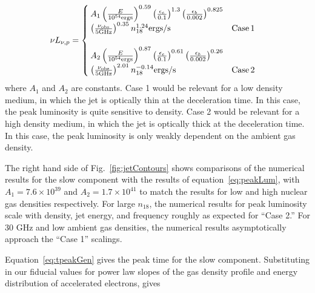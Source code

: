 \documentclass[usenatbib,fleqn]{mnras}
\begin{document}
\begin{align}
\nu L_{\nu, p}&=
\begin{cases}
  A_1 \left(\frac{E}{10^{54} {\rm ergs}}\right)^{0.59}
  \left(\frac{\epsilon_e}{0.1}\right)^{1.3}
  \left(\frac{\epsilon_b}{0.002}\right)^{0.825}\\
  \left(\frac{\nu_{\rm obs}}{5 {\rm GHz}}\right)^{0.35} n_{18}^{1.24} {\rm ergs/s} & {\rm Case \,1}\\\\
  A_2 \left(\frac{E}{10^{54} {\rm ergs}}\right)^{0.87}
  \left(\frac{\epsilon_e}{0.1}\right)^{0.61}
  \left(\frac{\epsilon_b}{0.002}\right)^{0.26}\\
  \left(\frac{\nu_{\rm obs}}{5 {\rm GHz}}\right)^{2.01} n_{18}^{-0.14}
  {\rm ergs/s} & {\rm Case \,2}
\end{cases}
\label{eq:peakLum}
\end{align}
%
where $A_1$ and $A_2$ are constants.  Case 1 would be relevant for a
low density medium, in which the jet is optically thin at the
deceleration time. In this case, the peak luminosity is quite
sensitive to density. Case 2 would be relevant for a high density
medium, in which the jet is optically thick at the deceleration
time. In this case, the peak luminosity is only weakly dependent on
the ambient gas density.

The right hand side of Fig.~\ref{fig:jetContours} shows comparisons of
the numerical results for the slow component with the results of
equation~\eqref{eq:peakLum}, with $A_1=7.6\times 10^{39}$ and $A_2=1.7
\times 10^{41}$ to match the results for low and high nuclear gas
densities respectively. For large $n_{18}$, the numerical results for
peak luminosity scale with density, jet energy, and frequency roughly
as expected for ``Case 2.'' For 30 GHz and low ambient gas densities,
the numerical results asymptotically approach the ``Case 1'' scalings.

Equation~\eqref{eq:tpeakGen} gives the peak time for the slow
component. Substituting in our fiducial values for power law slopes of
the gas density profile and energy distribution of accelerated
electrons, gives
\end{document}

